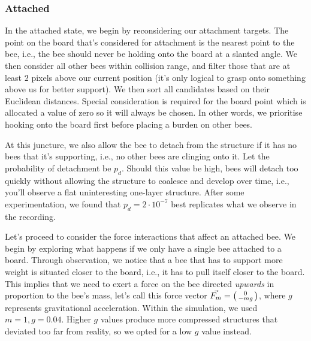 \documentclass[a4paper,10pt]{article}
\begin{document}
\begin{multicols}{2}
    \subsubsection{Attached}

    In the attached state, we begin by reconsidering our attachment targets. The point on the board
    that's considered for attachment is the nearest point to the bee, i.e., the bee should never
    be holding onto the board at a slanted angle. We then consider all other bees within collision
    range, and filter those that are at least $2$ pixels above our current position (it's only logical
    to grasp onto something above us for better support). We then sort all candidates based on
    their Euclidean distances. Special consideration is required for the board point which is allocated
    a value of zero so it will always be chosen. In other words, we prioritise hooking onto the board first
    before placing a burden on other bees.

    At this juncture, we also allow the bee to detach from the structure if it has no bees that it's
    supporting, i.e., no other bees are clinging onto it. Let the probability of detachment be
    $p_{d}$. Should this value be high, bees will detach too quickly without allowing the structure
    to coalesce and develop over time, i.e., you'll observe a flat uninteresting one-layer structure.
    After some experimentation, we found that $p_{d} = 2 \cdot 10^{-7}$ best replicates what we
    observe in the recording.

    Let's proceed to consider the force interactions that affect an attached bee. We begin by exploring
    what happens if we only have a single bee attached to a board. Through observation, we notice
    that a bee that has to support more weight is situated closer to the board, i.e., it has to pull
    itself closer to the board. This implies that we need to exert a force on the bee directed
    \textit{upwards} in proportion to the bee's mass, let's call this force vector
    $\vec{F_{m}} = \begin{psmallmatrix} 0 \\ -mg \end{psmallmatrix}$, where $g$
    represents gravitational acceleration. Within the simulation, we used $m = 1, g = 0.04$.
    Higher $g$ values produce more compressed structures that deviated too far from reality, so
    we opted for a low $g$ value instead.


\end{multicols}
\end{document}
